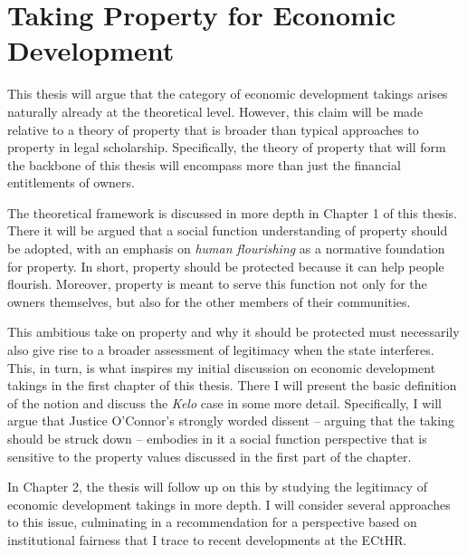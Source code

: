 \section{Taking Property for Economic Development}

This thesis will argue that the category of economic development takings arises naturally already at the theoretical level. However, this claim will be made relative to a theory of property that is broader than typical approaches to property in legal scholarship. Specifically, the theory of property that will form the backbone of this thesis will encompass more than just the financial entitlements of owners. 

The theoretical framework is discussed in more depth in Chapter 1 of this thesis. There it will be argued that a social function understanding of property should be adopted, with an emphasis on {\it human flourishing} as a normative foundation for property. In short, property should be protected because it can help people flourish. Moreover, property is meant to serve this function not only for the owners themselves, but also for the other members of their communities.

This ambitious take on property and why it should be protected must necessarily also give rise to a broader assessment of legitimacy when the state interferes. This, in turn, is what inspires my initial discussion on economic development takings in the first chapter of this thesis. There I will present the basic definition of the notion and discuss the {\it Kelo} case in some more detail. Specifically, I will argue that Justice O'Connor's strongly worded dissent -- arguing that the taking should be struck down -- embodies in it a social function perspective that is sensitive to the property values discussed in the first part of the chapter.

In Chapter 2, the thesis will follow up on this by studying the legitimacy of economic development takings in more depth. I will consider several approaches to this issue, culminating in a recommendation for a perspective based on institutional fairness that I trace to recent developments at the ECtHR. 


